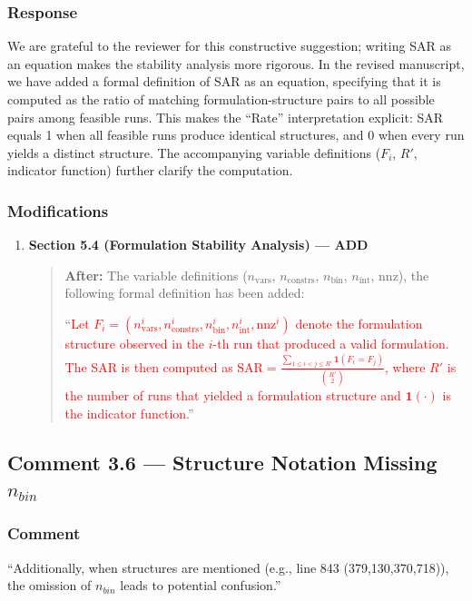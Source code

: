 \documentclass[11pt,a4paper]{article}
\begin{document}
\subsubsection{Response}
We are grateful to the reviewer for this constructive suggestion; writing SAR as an equation makes the stability analysis more rigorous. In the revised manuscript, we have added a formal definition of SAR as an equation, specifying that it is computed as the ratio of matching formulation-structure pairs to all possible pairs among feasible runs. This makes the ``Rate'' interpretation explicit: SAR equals 1 when all feasible runs produce identical structures, and 0 when every run yields a distinct structure. The accompanying variable definitions ($F_i$, $R'$, indicator function) further clarify the computation.

\subsubsection{Modifications}
\begin{enumerate}
\item \textbf{Section 5.4 (Formulation Stability Analysis) --- ADD}
\begin{quote}
\textbf{After:} The variable definitions ($n_{\text{vars}}$, $n_{\text{constrs}}$, $n_{\text{bin}}$, $n_{\text{int}}$, nnz), the following formal definition has been added:

``\textcolor{red}{Let $F_i=(n_{\text{vars}}^i, n_{\text{constrs}}^i, n_{\text{bin}}^i, n_{\text{int}}^i, \text{nnz}^i)$ denote the formulation structure observed in the $i$-th run that produced a valid formulation. The SAR is then computed as $\text{SAR}=\frac{\sum_{1\le i<j\le R'}\mathbf{1}(F_i=F_j)}{\binom{R'}{2}}$, where $R'$ is the number of runs that yielded a formulation structure and $\mathbf{1}(\cdot)$ is the indicator function.}''
\end{quote}
\end{enumerate}

\subsection{Comment 3.6 --- Structure Notation Missing $n_{bin}$}

\subsubsection{Comment}
``Additionally, when structures are mentioned (e.g., line 843 (379,130,370,718)), the omission of $n_{bin}$ leads to potential confusion.''
\end{document}
